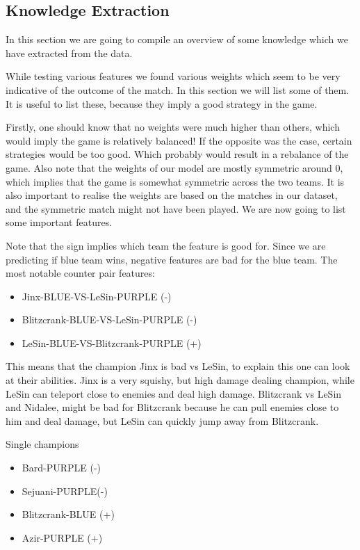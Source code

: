 \subsection{Knowledge Extraction} %
\label{sub:knowledge}
In this section we are going to compile an overview of some knowledge which we have extracted from the data. 


While testing various features we found various weights which seem to be very indicative of the outcome of the match. In this section we will list some of them. It is useful to list these, because they imply a good strategy in the game.

Firstly, one should know that no weights were much higher than others, which would imply the game is relatively balanced! If the opposite was the case, certain strategies would be too good. Which probably would result in a rebalance of the game. Also note that the weights of our model are mostly symmetric around 0, which implies that the game is somewhat symmetric across the two teams. It is also important to realise the weights are based on the matches in our dataset, and the symmetric match might not have been played. We are now going to list some important features. 

Note that the sign implies which team the feature is good for. Since we are predicting if blue team wins, negative features are bad for the blue team. The most notable counter pair features:
\begin{itemize}
    \item Jinx-BLUE-VS-LeSin-PURPLE (-)
    \item Blitzcrank-BLUE-VS-LeSin-PURPLE (-)
    \item LeSin-BLUE-VS-Blitzcrank-PURPLE (+)
\end{itemize}
This means that the champion Jinx is bad vs LeSin, to explain this one can look at their abilities. Jinx is a very squishy, but high damage dealing champion, while LeSin can teleport close to enemies and deal high damage. Blitzcrank vs LeSin and Nidalee, might be bad for Blitzcrank because he can pull enemies close to him and deal damage, but LeSin can quickly jump away from Blitzcrank.

Single champions 
\begin{itemize}
    \item Bard-PURPLE (-)
    \item Sejuani-PURPLE(-)
    \item Blitzcrank-BLUE (+)
    \item Azir-PURPLE (+)
\end{itemize}

